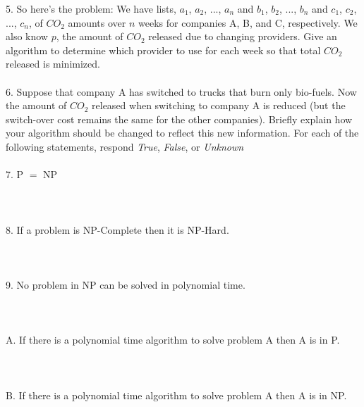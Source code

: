 \documentclass[12pt]{article}
\begin{document}
5. So here's the problem: We have lists, $a_1$, $a_2$, ..., $a_n$ and $b_1$, $b_2$, ..., $b_n$ and $c_1$, $c_2$, ..., $c_n$, of $CO_2$ amounts over $n$ weeks for 
companies A, B, and C, respectively.  We also know $p$, the amount of $CO_2$ released due to changing providers.  Give an algorithm 
to determine which provider to use for each week so that total $CO_2$ released is minimized.\\\\
6. Suppose that company A has switched to trucks that burn only bio-fuels. Now the amount of $CO_2$ released when switching to 
company A is reduced (but the switch-over cost remains the same for the other companies).  Briefly explain how your algorithm 
should be changed to reflect this new  information.
\newpage
For each of the following statements, respond \textit{True}, \textit{False}, or \textit{Unknown}\\\\
7. P $=$ NP\\\\\\\\
8. If a problem is NP-Complete then it is NP-Hard.\\\\\\\\
9. No problem in NP can be solved in polynomial time.\\\\\\\\
A. If there is a polynomial time algorithm to solve problem A then A is in P.\\\\\\\\
B. If there is a polynomial time algorithm to solve problem A then A is in NP.\\\\\\\\
\end{document}
